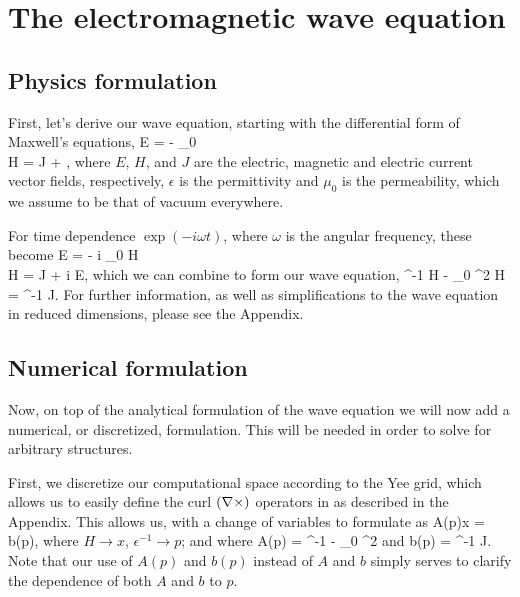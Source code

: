 \section{The electromagnetic wave equation}

\subsection{Physics formulation}
First, let's derive our wave equation,
    starting with the differential form of Maxwell's equations, 
\BA \curl E = - \mu_0  \\
    \curl H = J + \epsilon {}, \EA
    where $E$, $H$, and $J$ are 
    the electric, magnetic and electric current %
    vector fields, respectively,
    $\epsilon$ is the permittivity
    and $\mu_0$ is the permeability, which we assume to be 
    that of vacuum everywhere.


For time dependence $\exp(-i \omega t)$, 
    where $\omega$ is the angular frequency,
    these become
\BA \curl E = - i \mu_0 \omega H \\
    \curl H = J + i \epsilon \omega E, \label{eq:H2E} \EA
    which we can combine to form our wave equation,
\BE \curl \epsilon^{-1} \curl H - \mu_0 \omega^2 H = \curl \epsilon^{-1} J. 
    \label{eq:wave} \EE
For further information,
    as well as simplifications to the wave equation in reduced dimensions,
    please see the Appendix. %

\subsection{Numerical formulation}
Now, on top of the analytical formulation of the wave equation 
    we will now add a numerical, or discretized, formulation.
This will be needed in order to solve for arbitrary structures.

First, we discretize our computational space 
    according to the Yee grid, %
    which allows us to easily define the curl $(\nabla\times)$
    operators in  as described in the Appendix. %
This allows us, with a change of variables to formulate  as
\BE A(p)x = b(p), \label{eq:Ab} \EE 
    where $H \to x$, $\epsilon^{-1} \to p$; 
    and where
\BE A(p) = \curl \epsilon^{-1} \curl - \mu_0 \omega^2 \EE 
    and
\BE b(p) = \curl \epsilon^{-1} J. \EE
Note that our use of $A(p)$ and $b(p)$ instead of $A$ and $b$
    simply serves to clarify the dependence
    of both $A$ and $b$ to $p$.

